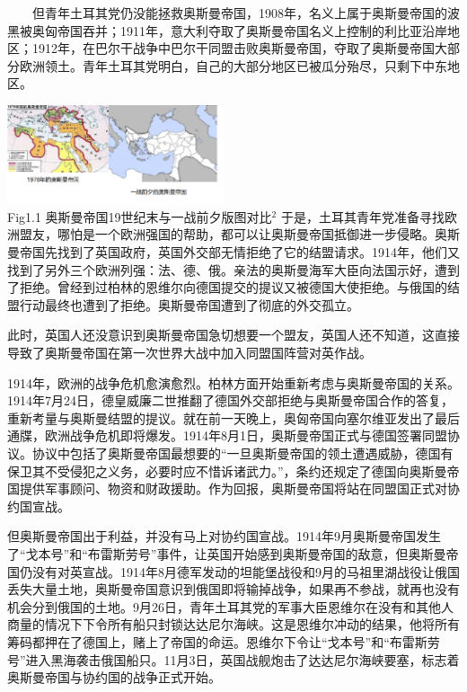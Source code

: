 \documentclass{article}
\begin{document}
\begin{flushleft}
    \justifying
    \ \ \ \ 但青年土耳其党仍没能拯救奥斯曼帝国，1908年，名义上属于奥斯曼帝国的波黑被奥匈帝国吞并；1911年，意大利夺取了奥斯曼帝国名义上控制的利比亚沿岸地区；1912年，在巴尔干战争中巴尔干同盟击败奥斯曼帝国，夺取了奥斯曼帝国大部分欧洲领土。青年土耳其党明白，自己的大部分地区已被瓜分殆尽，只剩下中东地区。
\end{flushleft}
\centering\includegraphics[width=6.4cm]{em.png}\\
\centering {} Fig1.1 奥斯曼帝国19世纪末与一战前夕版图对比$^2$\clearpage
{}
\justifying
\vspace{5pt}
于是，土耳其青年党准备寻找欧洲盟友，哪怕是一个欧洲强国的帮助，都可以让奥斯曼帝国抵御进一步侵略。奥斯曼帝国先找到了英国政府，英国外交部无情拒绝了它的结盟请求。1914年，他们又找到了另外三个欧洲列强：法、德、俄。亲法的奥斯曼海军大臣向法国示好，遭到了拒绝。曾经到过柏林的恩维尔向德国提交的提议又被德国大使拒绝。与俄国的结盟行动最终也遭到了拒绝。奥斯曼帝国遭到了彻底的外交孤立。

此时，英国人还没意识到奥斯曼帝国急切想要一个盟友，英国人还不知道，这直接导致了奥斯曼帝国在第一次世界大战中加入同盟国阵营对英作战。

1914年，欧洲的战争危机愈演愈烈。柏林方面开始重新考虑与奥斯曼帝国的关系。1914年7月24日，德皇威廉二世推翻了德国外交部拒绝与奥斯曼帝国合作的答复，重新考量与奥斯曼结盟的提议。就在前一天晚上，奥匈帝国向塞尔维亚发出了最后通牒，欧洲战争危机即将爆发。1914年8月1日，奥斯曼帝国正式与德国签署同盟协议。协议中包括了奥斯曼帝国最想要的“一旦奥斯曼帝国的领土遭遇威胁，德国有保卫其不受侵犯之义务，必要时应不惜诉诸武力。”，条约还规定了德国向奥斯曼帝国提供军事顾问、物资和财政援助。作为回报，奥斯曼帝国将站在同盟国正式对协约国宣战。

但奥斯曼帝国出于利益，并没有马上对协约国宣战。1914年9月奥斯曼帝国发生了“戈本号”和“布雷斯劳号”事件，让英国开始感到奥斯曼帝国的敌意，但奥斯曼帝国仍没有对英宣战。1914年8月德军发动的坦能堡战役和9月的马祖里湖战役让俄国丢失大量土地，奥斯曼帝国意识到俄国即将输掉战争，如果再不参战，就再也没有机会分到俄国的土地。9月26日，青年土耳其党的军事大臣恩维尔在没有和其他人商量的情况下下令所有船只封锁达达尼尔海峡。这是恩维尔冲动的结果，他将所有筹码都押在了德国上，赌上了帝国的命运。恩维尔下令让“戈本号”和“布雷斯劳号”进入黑海袭击俄国船只。11月3日，英国战舰炮击了达达尼尔海峡要塞，标志着奥斯曼帝国与协约国的战争正式开始。
\end{document}
